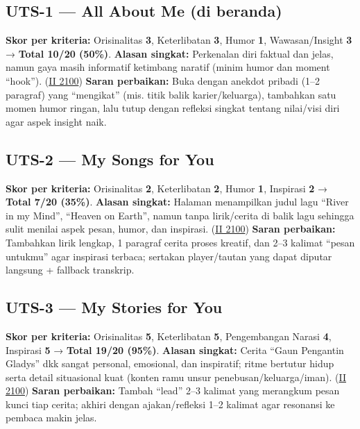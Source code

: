 \documentclass[
  letterpaper,
  DIV=11,
  numbers=noendperiod]{scrreprt}
\begin{document}
\subsection{UTS-1 --- All About Me (di
beranda)}\label{uts-1-all-about-me-di-beranda}

\textbf{Skor per kriteria:} Orisinalitas \textbf{3}, Keterlibatan
\textbf{3}, Humor \textbf{1}, Wawasan/Insight \textbf{3} → \textbf{Total
10/20 (50\%)}. \textbf{Alasan singkat:} Perkenalan diri faktual dan
jelas, namun gaya masih informatif ketimbang naratif (minim humor dan
moment ``hook''). (\href{https://ii-2100.github.io/all-about-me/}{II
2100}) \textbf{Saran perbaikan:} Buka dengan anekdot pribadi (1--2
paragraf) yang ``mengikat'' (mis. titik balik karier/keluarga),
tambahkan satu momen humor ringan, lalu tutup dengan refleksi singkat
tentang nilai/visi diri agar aspek insight naik.

\subsection{UTS-2 --- My Songs for You}\label{uts-2-my-songs-for-you-1}

\textbf{Skor per kriteria:} Orisinalitas \textbf{2}, Keterlibatan
\textbf{2}, Humor \textbf{1}, Inspirasi \textbf{2} → \textbf{Total 7/20
(35\%)}. \textbf{Alasan singkat:} Halaman menampilkan judul lagu ``River
in my Mind'', ``Heaven on Earth'', namun tanpa lirik/cerita di balik
lagu sehingga sulit menilai aspek pesan, humor, dan inspirasi.
(\href{https://ii-2100.github.io/all-about-me/My_Song_for_You/index.html}{II
2100}) \textbf{Saran perbaikan:} Tambahkan lirik lengkap, 1 paragraf
cerita proses kreatif, dan 2--3 kalimat ``pesan untukmu'' agar inspirasi
terbaca; sertakan player/tautan yang dapat diputar langsung + fallback
transkrip.

\subsection{UTS-3 --- My Stories for
You}\label{uts-3-my-stories-for-you-1}

\textbf{Skor per kriteria:} Orisinalitas \textbf{5}, Keterlibatan
\textbf{5}, Pengembangan Narasi \textbf{4}, Inspirasi \textbf{5} →
\textbf{Total 19/20 (95\%)}. \textbf{Alasan singkat:} Cerita ``Gaun
Pengantin Gladys'' dkk sangat personal, emosional, dan inspiratif; ritme
bertutur hidup serta detail situasional kuat (konten ramu unsur
penebusan/keluarga/iman).
(\href{https://ii-2100.github.io/all-about-me/My_Stories_for_You/index.html}{II
2100}) \textbf{Saran perbaikan:} Tambah ``lead'' 2--3 kalimat yang
merangkum pesan kunci tiap cerita; akhiri dengan ajakan/refleksi 1--2
kalimat agar resonansi ke pembaca makin jelas.
\end{document}
